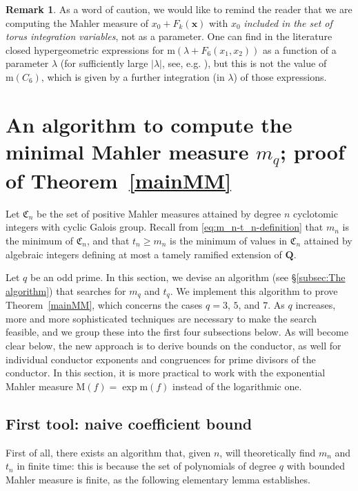 \documentclass[12pt,reqno]{amsart}
\theoremstyle{definition}
\theoremstyle{plain}
\theoremstyle{definition}
\newtheorem{remark}[theorem]{Remark}
\newcommand{\Q}{\mathbf{Q}}
\newcommand\m{\mathrm{m}}
\newcommand{\MM}{\mathrm{M}}
\renewcommand{\geq}{\geqslant}
\begin{document}
\begin{remark}
As a word of caution, we would like to remind the reader that we are computing the Mahler measure of $x_0+F_k(\mathbf x)$ with $x_0$ \emph{included in the set of torus integration variables}, not as a parameter. One can find in the literature closed hypergeometric expressions for $\m(\lambda+F_6(x_1,x_2))$ as a function of a parameter $\lambda$ (for sufficiently large $|\lambda|$, see, e.g. \cite[(2-37)]{LalinRogers}), but this is not the value of $\m(C_6)$, which is given by a further integration (in $\lambda$) of those expressions. 
\end{remark}


\section{An algorithm to compute the minimal Mahler measure $m_q$; proof of Theorem~\ref{mainMM}} \label{sectalg} 

Let $\mathfrak C_n$ be the set of positive Mahler measures attained by degree $n$ cyclotomic integers with cyclic Galois group. Recall from \eqref{eq:m_n-t_n-definition} that $m_n$ is the minimum of $\mathfrak C_n$, and that $t_n \geq m_n$ is the minimum of values in $\mathfrak C_n$ attained by algebraic integers defining at most a tamely ramified extension of $\Q$.

Let $q$ be an odd prime. In this section, we devise an algorithm (see \S \ref{subsec:The algorithm}) that searches for $m_q$ and $t_q$. 
We implement this algorithm to prove Theorem~\ref{mainMM}, which concerns the cases $q=3$, $5$, and $7$. As $q$ increases, more and more sophisticated techniques are necessary to make the search feasible, and we group these into the first four subsections below. As will become clear below, the  new approach is to derive bounds on the conductor, as well for individual conductor exponents and congruences for prime divisors of the conductor. 
 In this section, it is more practical to work with the exponential Mahler measure $\MM(f) = \exp \m(f)$ instead of the logarithmic one. 

\subsection{First tool: naive coefficient bound} 

First of all, there exists an algorithm that, given $n$, will theoretically find $m_n$ and $t_n$ in finite time: this is because the set of polynomials of degree $q$ with bounded Mahler measure is finite, as the following elementary lemma establishes. 
\end{document}
